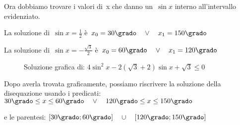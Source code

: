 \begin{esempio}
  Ora dobbiamo trovare i valori di~x che danno un~$\sin x$ interno 
  all'intervallo evidenziato.
  
  La soluzione di~$\sin x = \frac{1}{2}$ \quad
  è~\quad $x_0 = 30 \grado \quad \vee \quad x_1 = 150 \grado$
  
  La soluzione di~$\sin x = -\frac{\sqrt{3}}{2}$ \quad
  è~\quad $x_0 = 60 \grado \quad \vee \quad x_1 = 120 \grado$
  
\begin{figure}[!h] 
 \vspace{-6pt}
  \begin{center}
\begin{inaccessibleblock}
    
    \caption{Soluzione grafica di: 
             $4 \sin^2 x - 2 (\sqrt{3} + 2) \sin x + \sqrt{3} \le 0$}
    \label{fig:trigo_disequ01}
\end{inaccessibleblock}
  \end{center}
\vspace{-18pt}
\end{figure} 

Dopo averla trovata graficamente, possiamo riscrivere la soluzione della 
disequazione usando i predicati:\quad 
$30\grado \le x \le 60\grado \quad \vee \quad 
 120\grado \le x \le 150\grado$

e le parentesi:\quad 
$\left[30\grado ; 60\grado \right] \quad \cup \quad
 \left[120\grado ; 150\grado \right]$
  
 \end{esempio}
